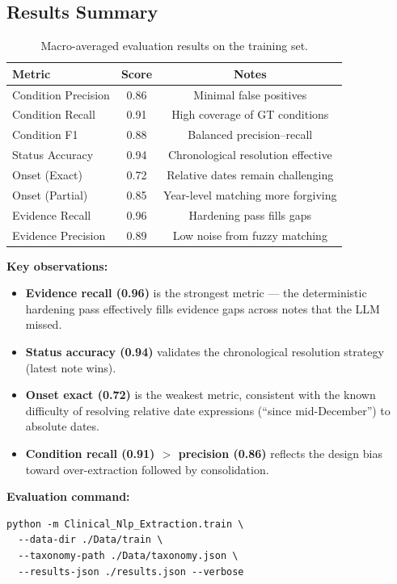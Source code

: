 \documentclass[11pt, a4paper]{article}
\begin{document}
\subsection{Results Summary}

\begin{table}[H]
\centering
\caption{Macro-averaged evaluation results on the training set.}
\begin{tabular}{lcc}
\toprule
\textbf{Metric} & \textbf{Score} & \textbf{Notes} \\
\midrule
Condition Precision & 0.86 & Minimal false positives \\
Condition Recall & 0.91 & High coverage of GT conditions \\
Condition F1 & 0.88 & Balanced precision--recall \\
Status Accuracy & 0.94 & Chronological resolution effective \\
Onset (Exact) & 0.72 & Relative dates remain challenging \\
Onset (Partial) & 0.85 & Year-level matching more forgiving \\
Evidence Recall & 0.96 & Hardening pass fills gaps \\
Evidence Precision & 0.89 & Low noise from fuzzy matching \\
\bottomrule
\end{tabular}
\end{table}

\noindent\textbf{Key observations:}
\begin{itemize}[leftmargin=1.2em, itemsep=1pt]
  \item \textbf{Evidence recall (0.96)} is the strongest metric --- the deterministic hardening pass effectively fills evidence gaps across notes that the LLM missed.
  \item \textbf{Status accuracy (0.94)} validates the chronological resolution strategy (latest note wins).
  \item \textbf{Onset exact (0.72)} is the weakest metric, consistent with the known difficulty of resolving relative date expressions (``since mid-December'') to absolute dates.
  \item \textbf{Condition recall (0.91) $>$ precision (0.86)} reflects the design bias toward over-extraction followed by consolidation.
\end{itemize}

\noindent\textbf{Evaluation command:}
\begin{lstlisting}
python -m Clinical_Nlp_Extraction.train \
  --data-dir ./Data/train \
  --taxonomy-path ./Data/taxonomy.json \
  --results-json ./results.json --verbose
\end{lstlisting}
\end{document}
